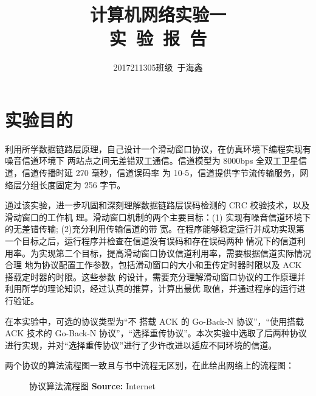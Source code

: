 \documentclass[14pt]{article} %
\title{\LARGE \bf 计算机网络实验一\\
实\ 验\ 报\ 告}
\author{2017211305班级\ 于海鑫}
\date{} %
\begin{document}

\section{实验目的}
利用所学数据链路层原理，自己设计一个滑动窗口协议，在仿真环境下编程实现有噪音信道环境下
两站点之间无差错双工通信。信道模型为 8000bps 全双工卫星信道，信道传播时延 270 毫秒，信道误码率
为 10-5，信道提供字节流传输服务，网络层分组长度固定为 256 字节。

通过该实验，进一步巩固和深刻理解数据链路层误码检测的 CRC 校验技术，以及滑动窗口的工作机
理。滑动窗口机制的两个主要目标：(1) 实现有噪音信道环境下的无差错传输; (2)充分利用传输信道的带
宽。在程序能够稳定运行并成功实现第一个目标之后，运行程序并检查在信道没有误码和存在误码两种
情况下的信道利用率。为实现第二个目标，提高滑动窗口协议信道利用率，需要根据信道实际情况合理
地为协议配置工作参数，包括滑动窗口的大小和重传定时器时限以及 ACK 搭载定时器的时限。这些参数
的设计，需要充分理解滑动窗口协议的工作原理并利用所学的理论知识，经过认真的推算，计算出最优
取值，并通过程序的运行进行验证。

在本实验中，可选的协议类型为“不
搭载 ACK 的 Go-Back-N 协议”，“使用搭载 ACK 技术的 Go-Back-N 协议”，“选择重传协议”。本次实验中选取了后两种协议进行实现，并对“选择重传协议”进行了少许改进以适应不同环境的信道。

两个协议的算法流程图一致且与书中流程无区别，在此给出网络上的流程图：

\begin{figure}[!htbp]        
	\caption{\label{1} 协议算法流程图 \textbf{Source:} Internet}      
\end{figure}
\end{document}
